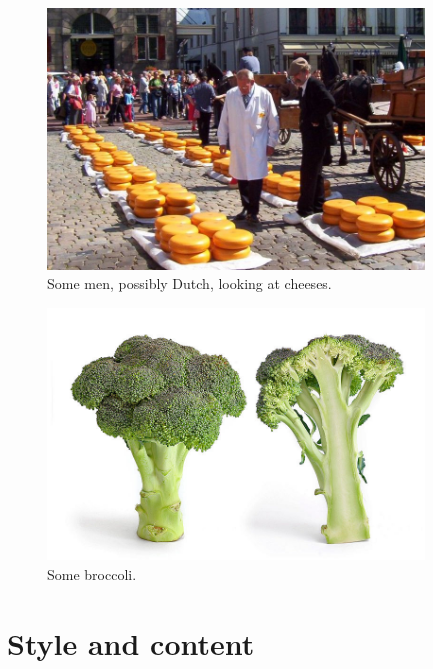 \begin{refsection}
\begin{figure}
\centerline{\includegraphics[width=10cm]{images/men-and-cheese.jpg}}
\caption{Some men, possibly Dutch, looking at cheeses.}\label{figure:menandcheeses}
\end{figure}

\begin{figure}
\centerline{\includegraphics[width=10cm]{images/broccoli.jpg}}
\caption{Some broccoli.}\label{figure:broccoli}
\end{figure}

\section{Style and content}


\end{refsection}
